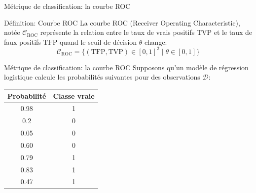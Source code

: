 \documentclass[10pt]{beamer}  %
\begin{document}
\begin{frame}{Métrique de classification: la courbe ROC}
	\begin{block}{Définition: Courbe ROC}
		La courbe ROC (Receiver Operating Characteristic), notée $\mathcal{C}_{\text{ROC}}$ représente la relation entre le taux de vrais positifs $\text{TVP}$ et le taux de faux positifs $\text{TFP}$ quand le seuil de décision $\theta$ change:
		\begin{equation}
			\mathcal{C}_{\text{ROC}} = \{ \left(\text{TFP}, \text{TVP}\right) \in [0, 1]^2 \mid \theta \in [0, 1]\}
			\nonumber
		\end{equation}
	\end{block}
\end{frame}

\begin{frame}{Métrique de classification: la courbe ROC}
	Supposons qu'un modèle de régression logistique calcule les probabilités suivantes pour des observations $\mathcal{D}$:
	\begin{table}
		\centering
		\begin{tabular}{|c|c|}
			\hline
			\textbf{Probabilité} & \textbf{Classe vraie} \\ \hline
			0.98 & 1 \\ \hline
			0.2  & 0 \\ \hline
			0.05 & 0 \\ \hline
			0.60 & 0 \\ \hline
			0.79 & 1 \\ \hline
			0.83 & 1 \\ \hline
			0.47 & 1 \\ \hline
		\end{tabular}
	\end{table}
\end{frame}
\end{document}
